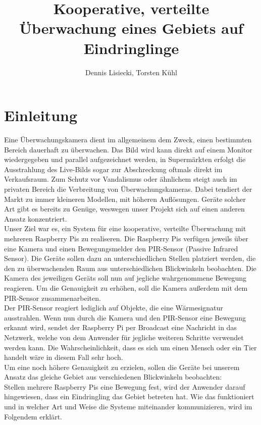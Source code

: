 \documentclass[journal]{IEEEtran}
\title{Kooperative, verteilte Überwachung eines Gebiets auf Eindringlinge}		%
\author{Dennis Lisiecki, Torsten Kühl}								%
\begin{document}

\maketitle	%


\section{Einleitung}
Eine Überwachungskamera dient im allgemeinem dem Zweck, einen bestimmten Bereich dauerhaft zu überwachen. Das Bild wird kann direkt auf einem Monitor wiedergegeben und parallel aufgezeichnet werden, in Supermärkten erfolgt die Ausstrahlung des Live-Bilds sogar zur Abschreckung oftmals direkt im Verkaufsraum. Zum Schutz vor Vandalismus oder ähnlichem steigt auch im privaten Bereich die Verbreitung von Überwachungskameras. Dabei tendiert der Markt zu immer kleineren Modellen, mit höheren Auflösungen. Geräte solcher Art gibt es bereits zu Genüge, weswegen unser Projekt sich auf einen anderen Ansatz konzentriert.\\ Unser Ziel war es, ein System für eine kooperative, verteilte Überwachung mit mehreren Raspberry Pis zu realiseren. Die Raspberry Pis verfügen jeweils über eine Kamera und einen Bewegungsmelder den PIR-Sensor (Passive Infrared Sensor). Die Geräte sollen dazu an unterschiedlichen Stellen platziert werden, die den zu überwachenden Raum aus unterschiedlichen Blickwinkeln beobachten. Die Kamera des jeweiligen Geräts soll nun auf jegliche wahrgenommene Bewegung reagieren. Um die Genauigkeit zu erhöhen, soll die Kamera außerdem mit dem PIR-Sensor zusammenarbeiten.\\ Der PIR-Sensor reagiert lediglich auf Objekte, die eine Wärmesignatur ausstrahlen. Wenn nun durch die Kamera und den PIR-Sensor eine Bewegung erkannt wird, sendet der Raspberry Pi per Broadcast eine Nachricht in das Netzwerk, welche von dem Anwender für jegliche weiteren Schritte verwendet werden kann. Die Wahrscheinlichkeit, dass es sich um einen Mensch oder ein Tier handelt wäre in diesem Fall sehr hoch.\\ Um eine noch höhere Genauigkeit zu erzielen, sollen die Geräte bei unserem Ansatz das gleiche Gebiet aus verschiedenen Blickwinkeln beobachten:\\ Stellen mehrere Raspberry Pis eine Bewegung fest, wird der Anwender darauf hingewiesen, dass ein Eindringling das Gebiet betreten hat. Wie das funktioniert und in welcher Art und Weise die Systeme miteinander kommunizieren, wird im Folgendem erklärt.
\end{document}
